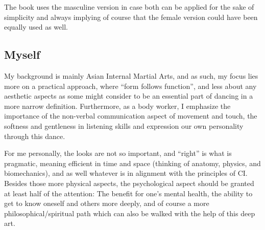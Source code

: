 The book uses the masculine version in case both can be applied for the sake of simplicity and always implying of course that the female version could have been equally used as well.

\subsection{Myself}\label{subsec:myself}

My background is mainly Asian Internal Martial Arts, and as such, my focus lies more on a practical approach, where ``form follows function'', and less about any aesthetic aspects as some might consider to be an essential part of dancing in a more narrow definition.
Furthermore, as a body worker, I emphasize the importance of the non-verbal communication aspect of movement and touch, the softness and gentleness in listening skills and expression our own personality through this dance.

For me personally, the looks are not so important, and ``right'' is what is pragmatic, meaning efficient in time and space (thinking of anatomy, physics, and biomechanics), and as well whatever is in alignment with the principles of CI.
Besides those more physical aspects, the psychological aspect should be granted at least half of the attention: The benefit for one's mental health, the ability to get to know oneself and others more deeply, and of course a more philosophical/spiritual path which can also be walked with the help of this deep art.

